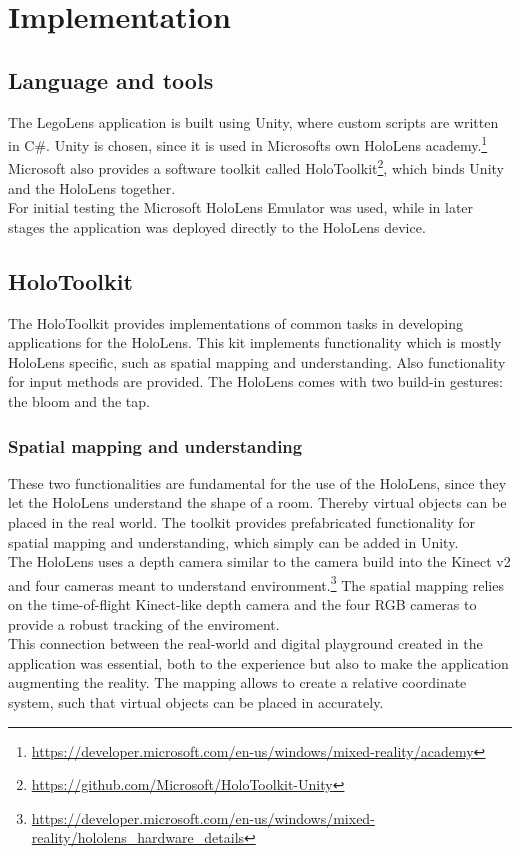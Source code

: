 \section{Implementation}

\subsection{Language and tools}
The LegoLens application is built using Unity, where custom scripts are written in C\#. Unity is chosen, since it is used in Microsofts own HoloLens academy.\footnote{\url{https://developer.microsoft.com/en-us/windows/mixed-reality/academy}} Microsoft also provides a software toolkit called HoloToolkit\footnote{\url{https://github.com/Microsoft/HoloToolkit-Unity}}, which binds Unity and the HoloLens together. \\
For initial testing the Microsoft HoloLens Emulator was used, while in later stages the application was deployed directly to the HoloLens device. 

\subsection{HoloToolkit}
The HoloToolkit provides implementations of common tasks in developing applications for the HoloLens. This kit implements functionality which is mostly HoloLens specific, such as spatial mapping and understanding. Also functionality for input methods are provided. The HoloLens comes with two build-in gestures: the bloom and the tap.

\subsubsection{Spatial mapping and understanding}
These two functionalities are fundamental for the use of the HoloLens, since they let the HoloLens understand the shape of a room. Thereby virtual objects can be placed in the real world. The toolkit provides prefabricated functionality for spatial mapping and understanding, which simply can be added in Unity.  \\
The HoloLens uses a depth camera similar to the camera build into the Kinect v2 and four cameras meant to understand environment.\footnote{\url{https://developer.microsoft.com/en-us/windows/mixed-reality/hololens_hardware_details}} The spatial mapping relies on the time-of-flight Kinect-like depth camera and the four RGB cameras to provide a robust tracking of the enviroment. \\
This connection between the real-world and digital playground created in the application was essential, both to the experience but also to make the application augmenting the reality. The mapping allows to create a relative coordinate system, such that virtual objects can be placed in accurately.

